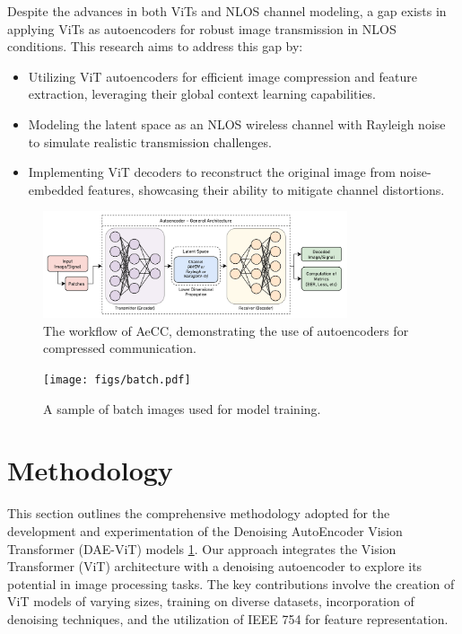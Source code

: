 \documentclass[10pt,twocolumn]{IEEEtran}
\begin{document}
Despite the advances in both ViTs and NLOS channel modeling, a gap exists in applying ViTs as autoencoders for robust image transmission in NLOS conditions. This research aims to address this gap by:
\begin{itemize}
    \item Utilizing ViT autoencoders for efficient image compression and feature extraction, leveraging their global context learning capabilities.
    \item Modeling the latent space as an NLOS wireless channel with Rayleigh noise to simulate realistic transmission challenges.
    \item Implementing ViT decoders to reconstruct the original image from noise-embedded features, showcasing their ability to mitigate channel distortions.
\end{itemize}
\begin{figure}[t!]
    \centering
    \includegraphics[width=0.8\textwidth]{figs/flow.png}
    \caption{The workflow of AeCC, demonstrating the use of autoencoders for compressed communication.}
    \label{fig:Workflow}
\end{figure}
\begin{figure}[b!]
    \centering
    \texttt{[image: figs/batch.pdf]}
    \caption{A sample of batch images used for model training.}
    \label{fig:batch}
\end{figure}

\section{Methodology}
This section outlines the comprehensive methodology adopted for the development and experimentation of the Denoising AutoEncoder Vision Transformer (DAE-ViT) models \ref{fig:Workflow}. Our approach integrates the Vision Transformer (ViT) architecture with a denoising autoencoder to explore its potential in image processing tasks. The key contributions involve the creation of ViT models of varying sizes, training on diverse datasets, incorporation of denoising techniques, and the utilization of IEEE 754 for feature representation.
\end{document}
